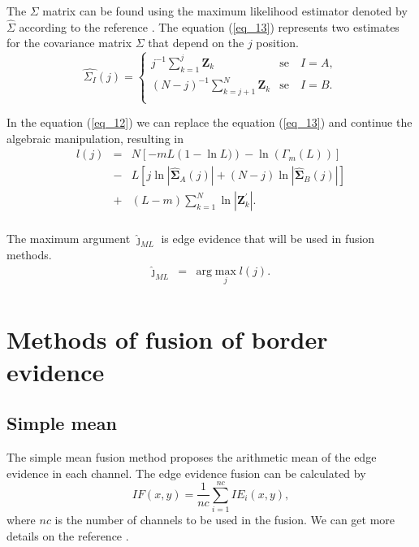 \documentclass[conference]{IEEEtran}
\begin{document}
The $\Sigma$ matrix can be found using the maximum likelihood estimator denoted by $\widehat{\Sigma}$ according to the reference \cite{good}. The equation (\ref{eq_13}) represents two estimates for the covariance matrix $\Sigma$ that depend on the $j$ position.
\begin{equation}\label{eq_13}
\widehat{\Sigma_{I}}(j) = \left\{
\begin{array}{lc}
	j^{-1}\sum_{k=1}^{j}\mathbf{Z}_{k}  & \mbox{se}\quad I=A,  \\
        (N-j)^{-1}\sum_{k=j+1}^{N}\mathbf{Z}_{k} & \mbox{se}\quad I=B. \\
\end{array}
\right.
\end{equation}

In the equation (\ref{eq_12}) we can replace the equation (\ref{eq_13}) and continue the algebraic manipulation, resulting in 
\begin{equation}\label{eq_14}
\begin{array}{rcl}
	l(j)&=&N\left[-mL(1-\ln{L)})-\ln{\left(\Gamma_m(L)\right)}\right]\\
	&-&L\left[j\ln{|\mathbf{\widehat{\Sigma}}_{A}(j)|} +(N-j)\ln{|\mathbf{\widehat{\Sigma}}_{B}(j)|}\right]\\
	&+&(L-m)\sum_{k=1}^{N}\ln{|\mathbf{Z}_{k}^{'}|}. \\
\end{array}
\end{equation}

The maximum argument $\widehat{\jmath}_{ML}$ is edge evidence that will be used in fusion methods.
\begin{equation*}
\begin{array}{rcl}
	\widehat{\jmath}_{ML}&=&\text{arg}\max\limits_{j}l(j).  \\
\end{array}
\end{equation*}
\section{Methods of fusion of border evidence}\label{sec_06}
\subsection{Simple mean}
The simple mean fusion method proposes the arithmetic mean of the edge evidence in each channel. The edge evidence fusion can be calculated by
\begin{equation}
	IF(x,y)=\frac{1}{nc}\sum_{i=1}^{nc}IE_i(x,y),
\end{equation}
where $nc$ is the number of channels to be used in the fusion. We can get more details on the reference \cite{mit}.
\end{document}
